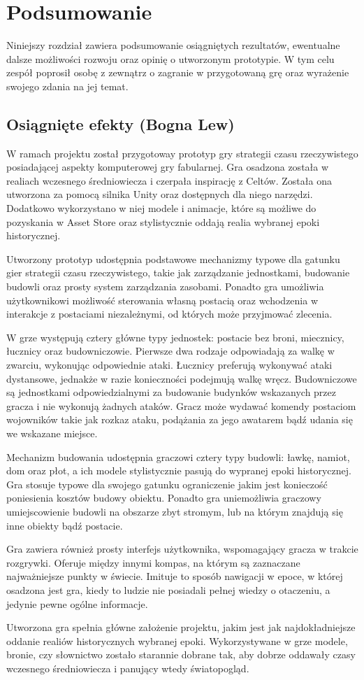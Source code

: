 \chapter{Podsumowanie}\label{chap:summary}
Niniejszy rozdział zawiera podsumowanie osiągniętych rezultatów, ewentualne dalsze możliwości rozwoju oraz opinię o
utworzonym prototypie. W tym celu zespół poprosił osobę z zewnątrz o zagranie w przygotowaną grę oraz wyrażenie swojego
zdania na jej temat.

\section{Osiągnięte efekty (Bogna Lew)}
W ramach projektu został przygotoway prototyp gry strategii czasu rzeczywistego posiadającej aspekty komputerowej gry
fabularnej. Gra osadzona została w realiach wczesnego średniowiecza i czerpała inspirację z Celtów. Została ona
utworzona za pomocą silnika Unity oraz dostępnych dla niego narzędzi. Dodatkowo wykorzystano w niej modele i animacje,
które są możliwe do pozyskania w Asset Store oraz stylistycznie oddają realia wybranej epoki historycznej.

Utworzony prototyp udostępnia podstawowe mechanizmy typowe dla gatunku gier strategii czasu rzeczywistego, takie jak
zarządzanie jednostkami, budowanie budowli oraz prosty system zarządzania zasobami. Ponadto gra umożliwia użytkownikowi
możliwość sterowania własną postacią oraz wchodzenia w interakcje z postaciami niezależnymi, od których może przyjmować
zlecenia.

W grze występują cztery główne typy jednostek: postacie bez broni, miecznicy, łucznicy oraz budowniczowie. Pierwsze dwa
rodzaje odpowiadają za walkę w zwarciu, wykonując odpowiednie ataki. Łucznicy preferują wykonywać ataki dystansowe,
jednakże w razie konieczności podejmują walkę wręcz. Budowniczowe są jednostkami odpowiedzialnymi za budowanie budynków
wskazanych przez gracza i nie wykonują żadnych ataków. Gracz może wydawać komendy postaciom wojowników takie jak rozkaz
ataku, podążania za jego awatarem bądź udania się we wskazane miejsce.

Mechanizm budowania udostępnia graczowi cztery typy budowli: ławkę, namiot, dom oraz płot, a ich modele stylistycznie
pasują do wypranej epoki historycznej. Gra stosuje typowe dla swojego gatunku ograniczenie jakim jest konieczość
poniesienia kosztów budowy obiektu. Ponadto gra uniemożliwia graczowy umiejscowienie budowli na obszarze zbyt stromym,
lub na którym znajdują się inne obiekty bądź postacie.

Gra zawiera również prosty interfejs użytkownika, wspomagający gracza w trakcie rozgrywki. Oferuje między innymi kompas,
na którym są zaznaczane najważniejsze punkty w świecie. Imituje to sposób nawigacji w epoce, w której osadzona jest gra,
kiedy to ludzie nie posiadali pełnej wiedzy o otaczeniu, a jedynie pewne ogólne informacje.

Utworzona gra spełnia główne założenie projektu, jakim jest jak najdokładniejsze oddanie realiów historycznych wybranej
epoki. Wykorzystywane w grze modele, bronie, czy słownictwo zostało starannie dobrane tak, aby dobrze oddawały
czasy wczesnego średniowiecza i panujący wtedy światopogląd.


